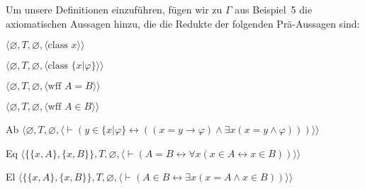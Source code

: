 Um unsere Definitionen einzuführen, fügen wir zu $\Gamma$ aus Beispiel~5 die axiomatischen Aussagen hinzu, die die Redukte der folgenden Prä-Aussagen sind: 
\begin{list}{}{\itemsep 0.0pt}
      \item[] $\langle\varnothing,T,\varnothing,
               \langle \mbox{class\ }x\rangle\rangle$
      \item[] $\langle\varnothing,T,\varnothing,
               \langle \mbox{class\ }\{x|\varphi\}\rangle\rangle$
      \item[] $\langle\varnothing,T,\varnothing,
               \langle \mbox{wff\ }A=B\rangle\rangle$
      \item[] $\langle\varnothing,T,\varnothing,
               \langle \mbox{wff\ }A\in B\rangle\rangle$
      \item[Ab] $\langle\varnothing,T,\varnothing,
               \langle \vdash ( y \in \{ x |\varphi\} \leftrightarrow
                  ( ( x = y \to\varphi) \wedge \exists x ( x = y
                  \wedge\varphi) ))
               \rangle\rangle$
      \item[Eq] $\langle\{\{x,A\},\{x,B\}\},T,\varnothing,
               \langle \vdash ( A = B \leftrightarrow
               \forall x ( x \in A \leftrightarrow x \in B ) )
               \rangle\rangle$
      \item[El] $\langle\{\{x,A\},\{x,B\}\},T,\varnothing,
               \langle \vdash ( A \in B \leftrightarrow \exists x
               ( x = A \wedge x \in B ) )
               \rangle\rangle$
\end{list}
